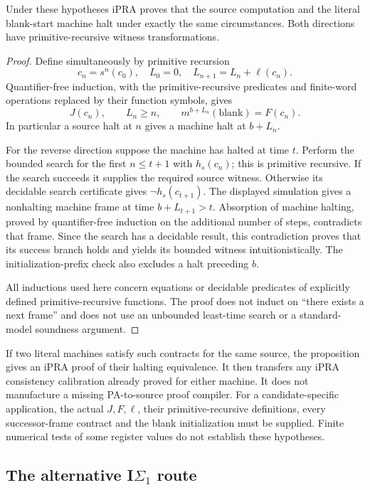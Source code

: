 \begin{proposition}
Under these hypotheses iPRA proves that the source computation and the
literal blank-start machine halt under exactly the same circumstances.
Both directions have primitive-recursive witness transformations.
\end{proposition}
\begin{proof}
Define simultaneously by primitive recursion
\[
 c_n=s^n(c_0),\quad
 L_0=0,\quad L_{n+1}=L_n+\ell(c_n).
\]
Quantifier-free induction, with the primitive-recursive predicates and
finite-word operations replaced by their function symbols, gives
\[
 J(c_n),\qquad L_n\geq n,\qquad
 m^{b+L_n}(\text{blank})=F(c_n).
\]
In particular a source halt at $n$ gives a machine halt at $b+L_n$.

For the reverse direction suppose the machine has halted at time $t$.
Perform the bounded search for the first $n\leq t+1$ with $h_s(c_n)$;
this is primitive recursive.  If the search succeeds it supplies the
required source witness.  Otherwise its decidable search certificate
gives $\neg h_s(c_{t+1})$.  The displayed simulation gives a nonhalting
machine frame at time $b+L_{t+1}>t$.  Absorption of machine halting,
proved by quantifier-free induction on the additional number of steps,
contradicts that frame.  Since the search has a decidable result, this
contradiction proves that its success branch holds and yields its
bounded witness intuitionistically.  The initialization-prefix check
also excludes a halt preceding $b$.

All inductions used here concern equations or decidable predicates of
explicitly defined primitive-recursive functions.  The proof does not
induct on ``there exists a next frame'' and does not use an unbounded
least-time search or a standard-model soundness argument.
\end{proof}

If two literal machines satisfy such contracts for the same source, the
proposition gives an iPRA proof of their halting equivalence.  It then
transfers any iPRA consistency calibration already proved for either
machine.  It does not manufacture a missing PA-to-source proof compiler.
For a candidate-specific application, the actual $J,F,\ell$, their
primitive-recursive definitions, every successor-frame contract and the
blank initialization must be supplied.  Finite numerical tests of some
register values do not establish these hypotheses.

\subsection{The alternative I\texorpdfstring{$\Sigma_1$}{Sigma1} route}


